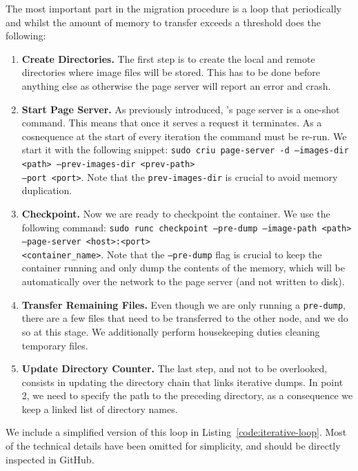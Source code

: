 The most important part in the migration procedure is a loop that periodically and whilst the amount of memory to transfer exceeds a threshold does the following:
\begin{enumerate}
    \item \textbf{Create Directories.} The first step is to create the local and remote directories where image files will be stored. This has to be done before anything else as otherwise the page server will report an error and crash.
    \item \textbf{Start Page Server.} As previously introduced, \criu's page server is a one-shot command. This means that once it serves a request it terminates. As a cosnequence at the start of every iteration the command must be re-run. We start it with the following snippet: \texttt{sudo criu page-server -d --images-dir <path> --prev-images-dir <prev-path>} \\\texttt{--port <port>}. Note that the \texttt{prev-images-dir} is crucial to avoid memory duplication.
    \item \textbf{Checkpoint.} Now we are ready to checkpoint the container. We use the following command: \texttt{sudo runc checkpoint --pre-dump --image-path <path> --page-server <host>:<port>} \\\texttt{<container\_name>}. Note that the \texttt{--pre-dump} flag is crucial to keep the container running and only dump the contents of the memory, which will be automatically over the network to the page server (and not written to disk).
    \item \textbf{Transfer Remaining Files.} Even though we are only running a \texttt{pre-dump}, there are a few files that need to be transferred to the other node, and we do so at this stage. We additionally perform housekeeping duties cleaning temporary files.
    \item \textbf{Update Directory Counter.} The last step, and not to be overlooked, consists in updating the directory chain that links iterative dumps. In point 2, we need to specify the path to the preceding directory, as a consequence we keep a linked list of directory names.
\end{enumerate}
We include a simplified version of this loop in Listing~\ref{code:iterative-loop}.
Most of the technical details have been omitted for simplicity, and should be directly inspected in GitHub.

